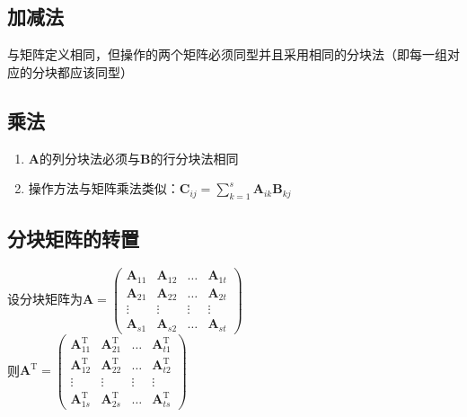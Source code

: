 \documentclass[12pt,oneside]{ctexbook}
\begin{document}
\subsection{加减法}
与矩阵定义相同，但操作的两个矩阵必须同型并且采用相同的分块法（即每一组对应的分块都应该同型）
\subsection{乘法}
\label{dividedMatrixMulti}
\begin{enumerate}
    \item \(\mathbf{A}\)的列分块法必须与\(\mathbf{B}\)的行分块法相同
    \item 操作方法与矩阵乘法类似：\(\mathbf{C}_{ij}=\sum\limits_{k=1}^s \mathbf{A}_{ik}\mathbf{B}_{kj}\)
\end{enumerate}
\subsection{分块矩阵的转置}
设分块矩阵为\(\mathbf{A}=\begin{pmatrix}
    \mathbf{A}_{11}&\mathbf{A}_{12}&\dots&\mathbf{A}_{1t}
    \\\mathbf{A}_{21}&\mathbf{A}_{22}&\dots&\mathbf{A}_{2t}
    \\ \vdots &\vdots &\vdots &\vdots
    \\\mathbf{A}_{s1}&\mathbf{A}_{s2}&\dots&\mathbf{A}_{st}
\end{pmatrix}\)
\\则\(\mathbf{A}^\mathrm{T}=\begin{pmatrix}
    \mathbf{A}^\mathrm{T}_{11}&\mathbf{A}^\mathrm{T}_{21}&\dots&\mathbf{A}^\mathrm{T}_{t1}
    \\\mathbf{A}^\mathrm{T}_{12}&\mathbf{A}^\mathrm{T}_{22}&\dots&\mathbf{A}^\mathrm{T}_{t2}
    \\ \vdots &\vdots &\vdots &\vdots
    \\\mathbf{A}^\mathrm{T}_{1s}&\mathbf{A}^\mathrm{T}_{2s}&\dots&\mathbf{A}^\mathrm{T}_{ts}
\end{pmatrix}\)
\end{document}
